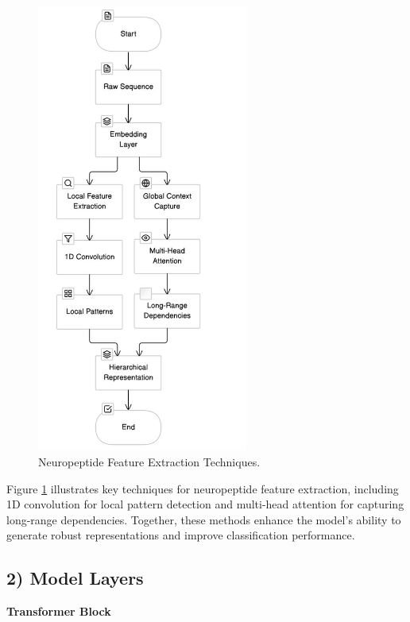 \documentclass[conference]{IEEEtran}
\begin{document}
\vspace{-1em}
\begin{figure}[h]
    \centering
    \includegraphics[height = 14.8cm, width=10.2 cm]{Images/4.png}
    \vspace{-1.6em}
    \caption{Neuropeptide Feature Extraction Techniques.}
    \label{fig:neuropeptide-feature-extraction}
\end{figure}

Figure \ref{fig:neuropeptide-feature-extraction} illustrates key techniques for neuropeptide feature extraction, including 1D convolution for local pattern detection and multi-head attention for capturing long-range dependencies. Together, these methods enhance the model's ability to generate robust representations and improve classification performance.

\subsection*{2) Model Layers}
\textbf{Transformer Block}
\end{document}

